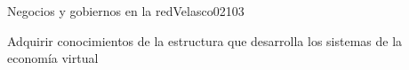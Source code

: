 \begin{syllabus}
\begin{unit}{Negocios y gobiernos en la red}{Velasco02}{10}{3}
   \begin{unitgoals}
      \item Adquirir conocimientos de la estructura que desarrolla los sistemas de la economía virtual
   \end{unitgoals}
\end{unit}

\begin{coursebibliography}
\end{coursebibliography}
\end{syllabus}
